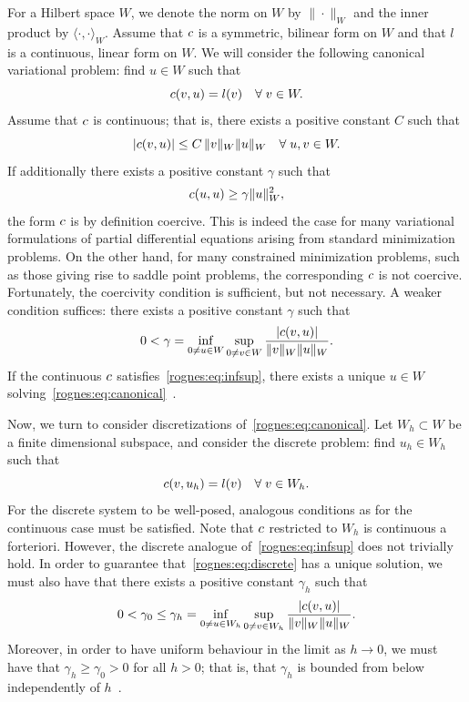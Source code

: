 For a Hilbert space $W$, we denote the norm on $W$ by
$\|\cdot\|_{W}$ and the inner product by $\langle \cdot, \cdot
\rangle_{W}$. Assume that $c$ is a symmetric, bilinear
form on $W$ and that $l$ is a continuous, linear form on
$W$. We will consider the following canonical variational
problem: find $u \in W$ such that
\begin{equation}
  \label{rognes:eq:canonical}
  c(v, u) = l(v) \quad \forall \; v \in W.
\end{equation}
Assume that $c$ is continuous; that is, there exists a positive
constant $C$ such that
\begin{equation*}
  |c(v, u)| \leq C \, \|v\|_{W} \|u\|_{W}
  \quad \forall \; u, v \in W.
\end{equation*}
If additionally there exists a positive constant $\gamma$ such that
\begin{equation*}
  c(u, u) \geq \gamma \|u\|_{W}^2,
\end{equation*}
the form $c$ is by definition coercive. This is indeed the case
for many variational formulations of partial differential equations
arising from standard minimization problems. On the other hand, for
many constrained minimization problems, such as those giving rise to
saddle point problems, the corresponding $c$ is not coercive.
Fortunately, the coercivity condition is sufficient, but not
necessary. A weaker condition suffices: there exists a positive
constant $\gamma$ such that
\begin{equation}
  \label{rognes:eq:infsup}
  0 < \gamma = \inf_{0 \not = u \in W} \sup_{0 \not = v \in W}
  \frac{|c(v,  u)|}{\|v\|_{W}\|u\|_{W}}.
\end{equation}
If the continuous $c$ satisfies~\eqref{rognes:eq:infsup}, there
exists a unique $u \in W$
solving~\eqref{rognes:eq:canonical}~\cite{Babuska1973}.

Now, we turn to consider discretizations
of~\eqref{rognes:eq:canonical}. Let $W_h \subset W$ be a
finite dimensional subspace, and consider the discrete problem: find
$u_h \in W_h$ such that
\begin{equation}
  \label{rognes:eq:discrete}
  c(v, u_h) = l(v) \quad \forall \; v \in W_h.
\end{equation}
For the discrete system to be well-posed, analogous conditions as for
the continuous case must be satisfied. Note that $c$ restricted
to $W_h$ is continuous a forteriori. However, the discrete
analogue of~\eqref{rognes:eq:infsup} does not trivially hold. In order
to guarantee that~\eqref{rognes:eq:discrete} has a unique solution, we
must also have that there exists a positive constant $\gamma_h$ such
that
\begin{equation}
  \label{rognes:eq:infsup:discrete}
  0 < \gamma_0 \leq \gamma_h = \inf_{0 \not = u \in W_h} \sup_{0
    \not = v \in W_h} \frac{|c(v, u)|}{\|v\|_{W}\|u\|_{W}}.
\end{equation}
Moreover, in order to have uniform behaviour in the limit as $h
\rightarrow 0$, we must have that $\gamma_h \geq \gamma_0 > 0$ for all
$h > 0$; that is, that $\gamma_h$ is bounded from below independently
of $h$~\cite{Babuska1973}.

